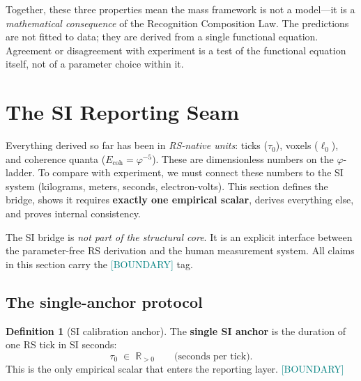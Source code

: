 \documentclass[11pt,a4paper]{article}
\theoremstyle{definition}
\newtheorem{definition}[theorem]{Definition}
\theoremstyle{remark}
\newcommand{\phig}{\varphi}
\newcommand{\Ecoh}{E_{\mathrm{coh}}}
\newcommand{\BOUNDARY}{\textcolor{teal}{\footnotesize\textsf{[BOUNDARY]}}}
\begin{document}
\noindent
Together, these three properties mean the mass framework is not a
model---it is a \emph{mathematical consequence} of the Recognition
Composition Law.  The predictions are not fitted to data; they are derived
from a single functional equation.  Agreement or disagreement with experiment
is a test of the functional equation itself, not of a parameter choice within
it.


\section{The SI Reporting Seam}
\label{sec:SI_bridge}

Everything derived so far has been in \emph{RS-native units}: ticks ($\tau_0$),
voxels ($\ell_0$), and coherence quanta ($\Ecoh = \phig^{-5}$).  These are
dimensionless numbers on the $\phig$-ladder.  To compare with experiment, we
must connect these numbers to the SI system (kilograms, meters, seconds,
electron-volts).  This section defines the bridge, shows it requires
\textbf{exactly one empirical scalar}, derives everything else, and proves
internal consistency.

The SI bridge is \emph{not part of the structural core}.  It is an explicit
interface between the parameter-free RS derivation and the human measurement
system.  All claims in this section carry the \BOUNDARY{} tag.

\subsection{The single-anchor protocol}

\begin{definition}[SI calibration anchor]
\label{def:SI_anchor}
The \textbf{single SI anchor} is the duration of one RS tick in SI seconds:
\begin{equation}
  \tau_0 \;\in\; \mathbb{R}_{>0}
  \qquad\text{(seconds per tick).}
  \label{eq:tau0}
\end{equation}
This is the only empirical scalar that enters the reporting layer. \BOUNDARY{}
\end{definition}
\end{document}
